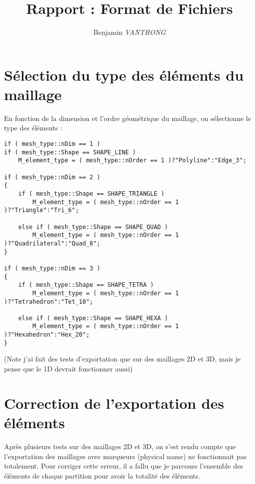 \documentclass[12pt]{article}
\title {Rapport : Format de Fichiers}
\author {Benjamin \emph{VANTHONG}}
\begin{document}
\maketitle 
\section {Sélection du type des éléments du maillage}
En fonction de la dimension et l'ordre géométrique du maillage, on sélectionne le type des éléments  :
\begin{lstlisting}
if ( mesh_type::nDim == 1 )
if ( mesh_type::Shape == SHAPE_LINE )
    M_element_type = ( mesh_type::nOrder == 1 )?"Polyline":"Edge_3";

if ( mesh_type::nDim == 2 )
{
    if ( mesh_type::Shape == SHAPE_TRIANGLE )
        M_element_type = ( mesh_type::nOrder == 1 )?"Triangle":"Tri_6";

    else if ( mesh_type::Shape == SHAPE_QUAD )
        M_element_type = ( mesh_type::nOrder == 1 )?"Quadrilateral":"Quad_8";
}

if ( mesh_type::nDim == 3 )
{
    if ( mesh_type::Shape == SHAPE_TETRA )
        M_element_type = ( mesh_type::nOrder == 1 )?"Tetrahedron":"Tet_10";

    else if ( mesh_type::Shape == SHAPE_HEXA )
        M_element_type = ( mesh_type::nOrder == 1 )?"Hexahedron":"Hex_20";
}
\end{lstlisting}
(Note j'ai fait des tests d'exportation que sur des maillages 2D et 3D, mais je pense que le 1D devrait fonctionner aussi)

\section {Correction de l'exportation des éléments}
Après plusieurs tests sur des maillages 2D et 3D, on s'est rendu compte que l'exportation des maillages avec marqueurs (physical name) ne fonctionnait pas totalement. Pour corriger cette erreur, il a fallu que je parcours l'ensemble des éléments de chaque partition pour avoir la totalité des éléments.
\end{document}
